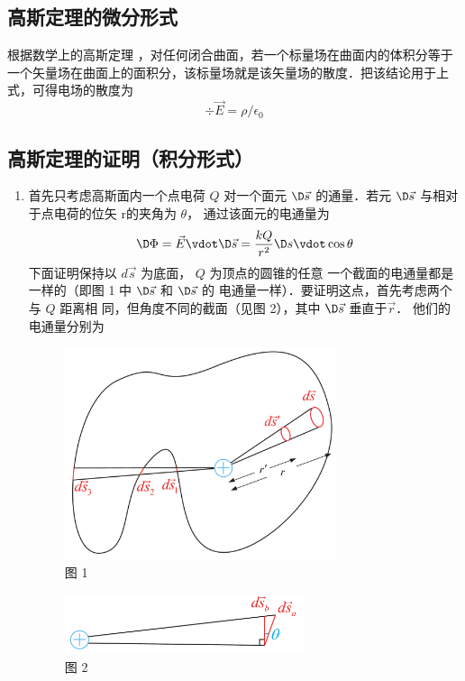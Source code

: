 \subsection{高斯定理的微分形式}

根据数学上的高斯定理%
，对任何闭合曲面，若一个标量场在曲面内的体积分等于一个矢量场在曲面上的面积分，该标量场就是该矢量场的散度．把该结论用于上式，可得电场的散度为
\begin{equation}
\div \vec E = \rho / \epsilon_0
\end{equation} 


\subsection{高斯定理的证明（积分形式）}
\begin{enumerate}
\item 首先只考虑高斯面内一个点电荷 $Q$ 对一个面元 $\D\vec s$ 的通量．若元 $\D\vec s$ 与相对于点电荷的位矢 \vec r的夹角为 $\theta $， 通过该面元的电通量为
\begin{equation}
\D \Phi  = \vec E \vdot \D \vec s = \frac{{kQ}}{{{r^2}}}\D s \vdot \cos \theta 
\end{equation} 
下面证明保持以 $d\vec s$ 为底面， $Q$ 为顶点的圆锥的任意
一个截面的电通量都是一样的（即图 1 中 $\D\vec s$ 和 $\D\vec s$ 的
电通量一样）．要证明这点，首先考虑两个与 $Q$ 距离相
同，但角度不同的截面（见图 2），其中 $\D\vec s$ 垂直于$\vec r$． 他们的电通量分别为
\begin{figure}[h]
\centering
\includegraphics[width=8cm]{./figures/EGauss1.pdf}
\caption{图 1}
\end{figure}
\begin{figure}[h]
\centering
\includegraphics[width=7cm]{./figures/EGauss2.pdf}
\caption{图 2}
\end{figure}


\end{enumerate}
